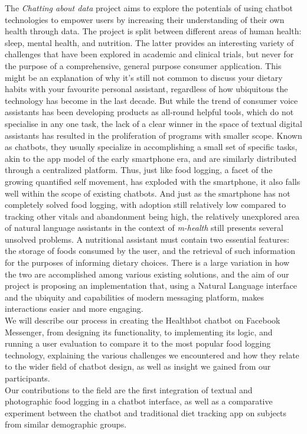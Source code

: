 
The \textit{Chatting about data} project aims to explore the potentials of using chatbot technologies to empower users by increasing their understanding of their own health through data. The project is split between different areas of human health: sleep, mental health, and nutrition. The latter provides an interesting variety of challenges that have been explored in academic and clinical trials, but never for the purpose of a comprehensive, general purpose consumer application. This might be an explanation of why it’s still not common to discuss your dietary habits with your favourite personal assistant, regardless of how ubiquitous the technology has become in the last decade. But while the trend of consumer voice assistants has been developing products as all-round helpful tools, which do not specialise in any one task, the lack of a clear winner in the space of textual digital assistants has resulted in the proliferation of programs with smaller scope. Known as chatbots, they usually specialize in accomplishing a small set of specific tasks, akin to the app model of the early smartphone era, and are similarly distributed through a centralized platform. Thus, just like food logging, a facet of the growing quantified self movement, has exploded with the smartphone, it also falls well within the scope of existing chatbots. And just as the smartphone has not completely solved food logging, with adoption still relatively low compared to tracking other vitals and abandonment being high, the relatively unexplored area of natural language assistants in the context of \textit{m-health} still presents several unsolved problems.
A nutritional assistant must contain two essential features: the storage of foods consumed by the user, and the retrieval of such information for the purposes of informing dietary choices. There is a large variation in how the two are accomplished among various existing solutions, and the aim of our project is proposing an implementation that, using a Natural Language interface and the ubiquity and capabilities of modern messaging platform, makes interactions easier and more engaging. \\
We will describe our process in creating the Healthbot chatbot on Facebook Messenger, from designing its functionality, to implementing its logic, and running a user evaluation to compare it to the most popular food logging technology, explaining the various challenges we encountered and how they relate to the wider field of chatbot design, as well as insight we gained from our participants. \\
Our contributions to the field are the first integration of textual and photographic food logging in a chatbot interface, as well as a comparative experiment between the chatbot and traditional diet tracking app on subjects from similar demographic groups.
